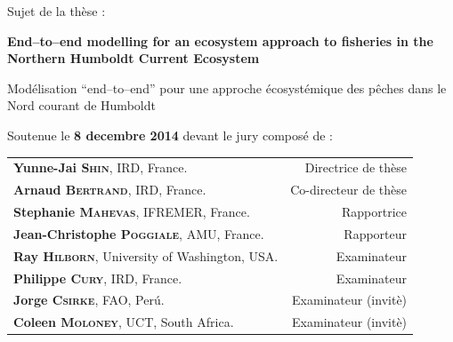 \begin{titlepage}
\begin{center}
\vspace*{.005\textheight}
\begin{center}
{\large Sujet de la th\`{e}se :}
\end{center}

\begin{center}
\large{\bf End--to--end modelling for an ecosystem approach to fisheries in the Northern Humboldt Current Ecosystem}\\
\end{center}

\begin{center}
\large{Mod\'{e}lisation ``end--to--end'' pour une approche \'{e}cosyst\'{e}mique des p\^{e}ches dans le Nord courant de Humboldt}\\
\end{center}

\vspace*{.015\textheight}
\begin{center}
{\large Soutenue le \textbf{8 decembre 2014} devant le jury compos\'{e} de : }
\end{center}


\begin{tabular}{lr}
\textbf{Yunne-Jai \textsc{Shin}}, IRD, France. & Directrice de th\`{e}se\\
\textbf{Arnaud \textsc{Bertrand}}, IRD, France. & Co-directeur de th\`{e}se\\
\textbf{Stephanie \textsc{Mahevas}}, IFREMER, France. & Rapportrice\\
\textbf{Jean-Christophe \textsc{Poggiale}}, AMU, France. & Rapporteur\\
\textbf{Ray \textsc{Hilborn}}, University of Washington, USA. & Examinateur\\
\textbf{Philippe \textsc{Cury}}, IRD, France. & Examinateur\\
\textbf{Jorge \textsc{Csirke}}, FAO, Per\'u. & Examinateur (invit\`{e})\\
\textbf{Coleen \textsc{Moloney}}, UCT, South Africa. & Examinateur (invit\`{e})\\
\end{tabular}



\end{center}

\end{titlepage}